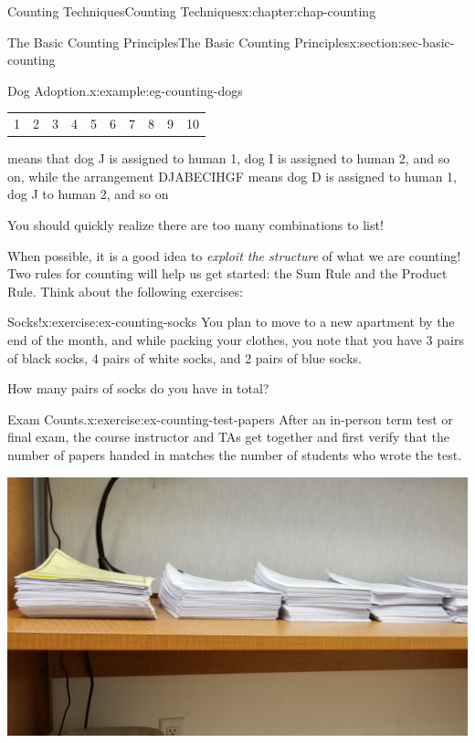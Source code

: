 \documentclass[oneside,10pt,]{book}
\numberwithin{equation}{section}
\begin{document}
\begin{chapterptx}{Counting Techniques}{}{Counting Techniques}{}{}{x:chapter:chap-counting}
\begin{sectionptx}{The Basic Counting Principles}{}{The Basic Counting Principles}{}{}{x:section:sec-basic-counting}
\begin{example}{Dog Adoption.}{x:example:eg-counting-dogs}
\begin{sidebyside}{1}{0.1}{0.1}{0}
\begin{sbspanel}{0.8}
{{{\begin{tabular}{llllllllll}
1&2&3&4&5&6&7&8&9&10
\end{tabular}
}%
\par}
}%
\end{sbspanel}%
\end{sidebyside}%
\par
means that dog J is assigned to human 1, dog I is assigned to human 2, and so on, while the arrangement DJABECIHGF means dog D is assigned to human 1, dog J to human 2, and so on\textellipsis{}%
\par
You should quickly realize there are too many combinations to list!%
\end{example}
When possible, it is a good idea to \emph{exploit the structure} of what we are counting! Two rules for counting will help us get started: the Sum Rule and the Product Rule. Think about the following exercises:%
\begin{inlineexercise}{Socks!}{x:exercise:ex-counting-socks}%
You plan to move to a new apartment by the end of the month, and while packing your clothes, you note that you have 3 pairs of black socks, 4 pairs of white socks, and 2 pairs of blue socks.%
\par
How many pairs of socks do you have in total?%
\end{inlineexercise}%
\begin{inlineexercise}{Exam Counts.}{x:exercise:ex-counting-test-papers}%
After an in-person term test or final exam, the course instructor and TAs get together and first verify that the number of papers handed in matches the number of students who wrote the test.%
\begin{sidebyside}{1}{0.25}{0.25}{0}%
\begin{sbspanel}{0.5}%
\includegraphics[width=\linewidth]{figs/test-papers.jpg}
\end{sbspanel}%
\end{sidebyside}%

\end{inlineexercise}
\end{sectionptx}
\end{chapterptx}
\end{document}
